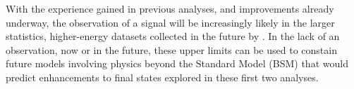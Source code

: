 \par With the experience gained in previous analyses, and improvements
already underway, the observation of a \ttH signal will be
increasingly likely in the larger statistics, higher-energy datasets
collected in the future by \ttH.  In the lack of an observation, now
or in the future, these upper limits can be used to constain future
models involving physics beyond the Standard Model (BSM) that would
predict enhancements to final states explored in these first two \ttH
analyses.  